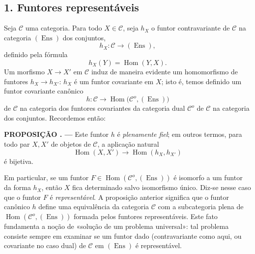 \documentclass[11pt,twoside,openany]{book}
\numberwithin{equation}{section}
\theoremstyle{plain}
\theoremstyle{definition}
\theoremstyle{remark}
\newcommand{\result}[2]{%
  \par\medskip\noindent\textbf{#1%
  \if\relax\detokenize{#2}\relax\else\space#2\fi. ---}\enspace
}
\begin{document}
\subsection*{1. Funtores representáveis}

Seja $\mathcal C$ uma categoria. Para todo $X\in\mathcal C$, seja $h_X$ o
funtor contravariante de $\mathcal C$ na categoria $(\operatorname{Ens})$
dos conjuntos,
\[
  h_X:\mathcal C\longrightarrow(\operatorname{Ens}),
\]
definido pela fórmula
\[
  h_X(Y)=\operatorname{Hom}(Y,X).
\]
Um morfismo $X\longrightarrow X'$ em $\mathcal C$ induz de maneira evidente um
homomorfismo de funtores $h_X\longrightarrow h_{X'}$: $h_X$ é um funtor
covariante em $X$; isto é, temos definido um funtor covariante canônico
\[
  h:\mathcal C\longrightarrow
  \operatorname{Hom}\bigl(\mathcal C^o,(\operatorname{Ens})\bigr)
\]
de $\mathcal C$ na categoria dos funtores covariantes da categoria dual
$\mathcal C^o$ de $\mathcal C$ na categoria dos conjuntos. Recordemos
então:

\result{PROPOSIÇÃO}{1.1} Este funtor $h$ é \emph{plenamente fiel}; em outros
termos, para todo par $X,X'$ de objetos de $\mathcal C$, a aplicação
natural
\[
  \operatorname{Hom}(X,X')\longrightarrow
  \operatorname{Hom}(h_X,h_{X'})
\]
é bijetiva.

Em particular, se um funtor
$F\in\operatorname{Hom}(\mathcal C^o,(\operatorname{Ens}))$ é isomorfo a um
funtor da forma $h_X$, então $X$ fica determinado salvo isomorfismo
único. Diz-se nesse caso que o funtor $F$ é \emph{representável}. A
proposição anterior significa que o funtor canônico $h$ define uma
equivalência da categoria $\mathcal C$ com a subcategoria plena de
$\operatorname{Hom}(\mathcal C^o,(\operatorname{Ens}))$ formada pelos
funtores representáveis. Este fato fundamenta a noção de «solução de um
problema universal»: tal problema consiste sempre em examinar se um funtor
dado (contravariante como aqui, ou covariante no caso dual) de $\mathcal C$
em $(\operatorname{Ens})$ é representável.
\end{document}
